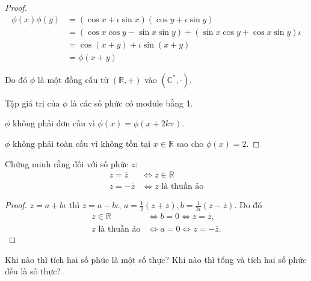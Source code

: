 \begin{proof}
    \begin{align*}
        \phi(x)\phi(y) & = (\cos x + \iota\sin x)(\cos y + \iota\sin y)                       \\
                       & = (\cos x\cos y - \sin x\sin y) + (\sin x\cos y + \cos x\sin y)\iota \\
                       & = \cos (x + y) + \iota\sin(x + y)                                    \\
                       & = \phi(x + y)
    \end{align*}
    \par Do đó $\phi$ là một đồng cấu từ $(\mathbb{R},+)$ vào $(\mathbb{C}^{*},\cdot)$.
    \par Tập giá trị của $\phi$ là các số phức có module bằng 1.
    \par $\phi$ không phải đơn cấu vì $\phi(x) = \phi(x + 2k\pi)$.
    \par $\phi$ không phải toàn cấu vì không tồn tại $x\in\mathbb{R}$ sao cho $\phi(x) = 2$.
\end{proof}

\begin{exercise}Chứng minh rằng đối với số phức $z$:
    \begin{align*}
        z = \overline{z}  & \Longleftrightarrow z\in\mathbb{R}         \\
        z = -\overline{z} & \Longleftrightarrow \text{$z$ là thuần ảo}
    \end{align*}
\end{exercise}

\begin{proof}
    $z = a + b\iota$ thì $\overline{z} = a - b\iota$, $a = \frac{1}{2}(z + \overline{z}), b = \frac{1}{2\iota}(z - \overline{z})$. Do đó 
    \begin{align*}
        z \in \mathbb{R} & \Longleftrightarrow b = 0 \Longleftrightarrow z = \overline{z},       \\
        \text{$z$ là thuần ảo} & \Longleftrightarrow a = 0 \Longleftrightarrow z = -\overline{z}.
    \end{align*}
\end{proof}

\begin{exercise}Khi nào thì tích hai số phức là một số thực? Khi nào thì tổng và tích hai số phức đều là số thực?
\end{exercise}

